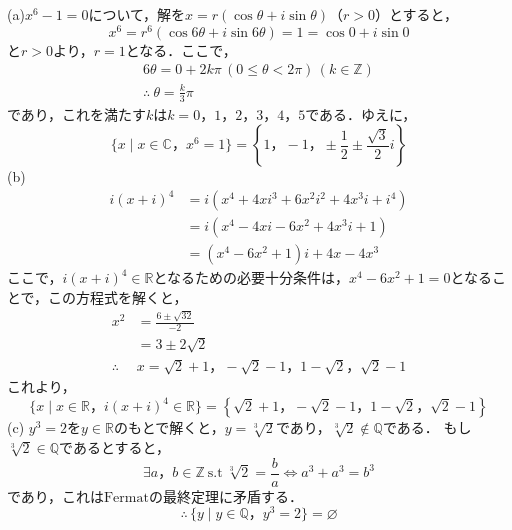 \documentclass[dvipdfmx,uplatex,11pt]{jsarticle}
\begin{document}
\begin{leftbar}
    (a)\quad $x^6 -1 =0$について，解を$x=r(\cos \theta + i \sin \theta)$（$r>0$）とすると，
    \[
        x^6 = r^6 (\cos 6 \theta + i \sin 6 \theta)=1 =\cos 0 + i \sin 0
    \]
    と$r>0$より，$r=1$となる．ここで，
    \begin{gather*}
        6 \theta = 0 + 2k\pi \, (0 \le \theta <2 \pi ) \, (k \in \mathbb{Z}) \\
        \therefore ~ \theta =\frac{k}{3}\pi 
    \end{gather*}
    であり，これを満たす$k$は$k=0，1，2，3，4，5$である．ゆえに，
    \[
        \{x \mid x \in \mathbb{C}，x^6=1\} = \left \{1，-1，\pm \frac{1}{2} \pm \frac{\sqrt{3}}{2} i \right \}
    \]
    (b) 
    \begin{align*}
    i(x+i)^4&=i(x^4 + 4 x i^3 +6 x^2 i^2 + 4x^3 i +i^4) \\
    & = i(x^4 -4 xi -6x^2 + 4x^3 i+1) \\
    & = (x^4-6x^2+1)i + 4x-4x^3
    \end{align*}
    ここで，$i(x+i)^4 \in \mathbb{R}$となるための必要十分条件は，$x^4-6x^2+1=0$となることで，この方程式を解くと，
    \begin{align*}
        x^2 &= \frac{6\pm \sqrt{32}}{-2} \\
        & = 3 \pm 2 \sqrt{2} \\
        \therefore & x= \sqrt{2}+1 ，-\sqrt{2}-1，1-\sqrt{2}，\sqrt{2}-1
    \end{align*}
    これより，
    \[
        \{x \mid x \in \mathbb{R}，i(x+i)^4 \in \mathbb{R}\} = \left \{  \sqrt{2}+1 ，-\sqrt{2}-1，1-\sqrt{2}，\sqrt{2}-1 \right \}
        \]
(c) \quad $y^3 =2$を$y \in \mathbb{R}$のもとで解くと，$y=\sqrt[3]{2}$であり，$\sqrt[3]{2} \notin \mathbb{Q}$である．
もし$\sqrt[3]{2} \in \mathbb{Q}$であるとすると，
\[
    \exists a，b \in \mathbb{Z} ~ \mathrm{s.t} ~ \sqrt[3]{2} = \frac{b}{a} \iff a^3 + a^3=b^3
\]
であり，これは$\mathrm{Fermat}$の最終定理に矛盾する．
\[
    \therefore \, \{y \mid y \in \mathbb{Q}，y^3=2 \} = \varnothing
\]
\end{leftbar}
​
\end{document}
